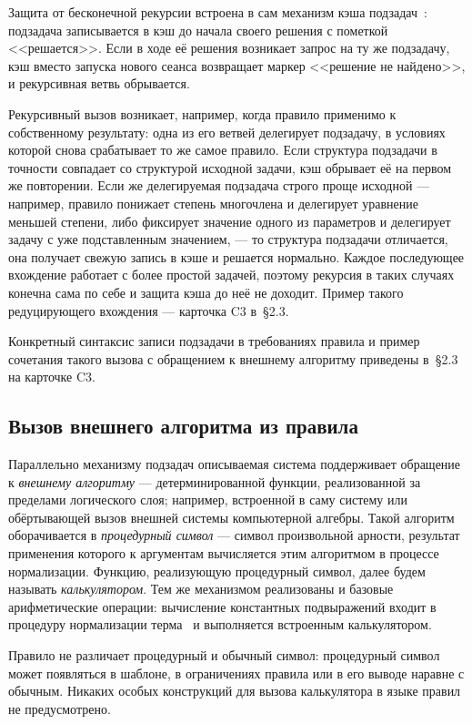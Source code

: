 \documentclass{intsys}
\begin{document}
Защита от бесконечной рекурсии встроена в сам механизм кэша
подзадач~\cite{IS-Annenkov2026}: подзадача записывается в кэш до
начала своего решения с пометкой <<решается>>. Если в ходе её
решения возникает запрос на ту же подзадачу, кэш вместо запуска
нового сеанса возвращает маркер <<решение не найдено>>, и
рекурсивная ветвь обрывается.

Рекурсивный вызов возникает, например, когда правило применимо к
собственному результату: одна из его ветвей делегирует подзадачу,
в условиях которой снова срабатывает то же самое правило. Если
структура подзадачи в точности совпадает со структурой исходной
задачи, кэш обрывает её на первом же повторении. Если же
делегируемая подзадача строго проще исходной --- например, правило
понижает степень многочлена и делегирует уравнение меньшей степени,
либо фиксирует значение одного из параметров и делегирует задачу с
уже подставленным значением, --- то структура подзадачи отличается,
она получает свежую запись в кэше и решается нормально. Каждое
последующее вхождение работает с более простой задачей, поэтому
рекурсия в таких случаях конечна сама по себе и защита кэша до неё
не доходит. Пример такого редуцирующего вхождения --- карточка C3
в~\S2.3.

Конкретный синтаксис записи подзадачи в требованиях правила и пример
сочетания такого вызова с обращением к внешнему алгоритму приведены
в~\S2.3 на карточке C3.

\subsection{Вызов внешнего алгоритма из правила}

Параллельно механизму подзадач описываемая система поддерживает
обращение к \emph{внешнему алгоритму} --- детерминированной функции,
реализованной за пределами логического слоя; например, встроенной в
саму систему или обёртывающей вызов внешней системы компьютерной
алгебры. Такой алгоритм оборачивается в \emph{процедурный
символ} --- символ произвольной арности, результат применения которого
к аргументам вычисляется этим алгоритмом в процессе нормализации.
Функцию, реализующую процедурный символ, далее будем называть
\emph{калькулятором}. Тем же механизмом реализованы и базовые
арифметические операции: вычисление константных подвыражений входит
в процедуру нормализации терма~\cite{IS-Annenkov2026} и выполняется
встроенным калькулятором.

Правило не различает процедурный и обычный символ: процедурный
символ может появляться в шаблоне, в ограничениях правила или в его
выводе наравне с обычным. Никаких особых конструкций для вызова
калькулятора в языке правил не предусмотрено.
\end{document}
